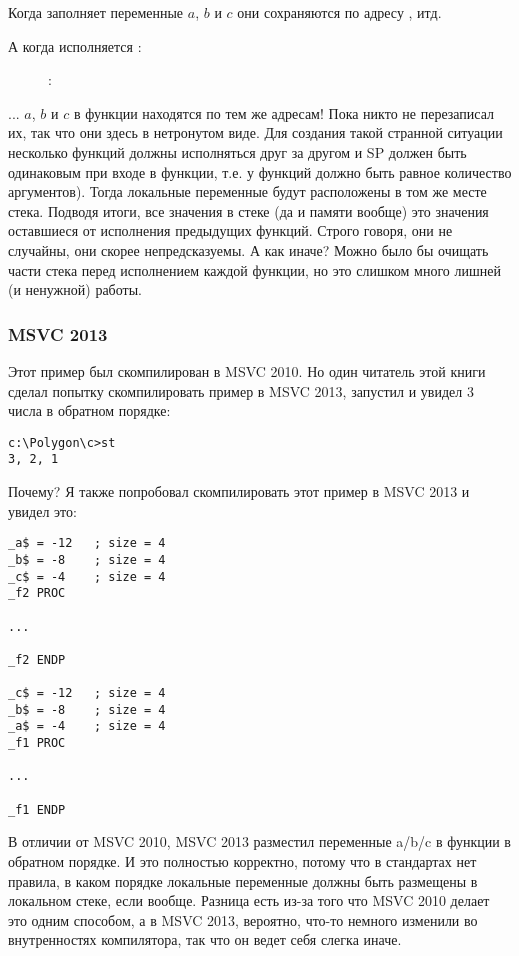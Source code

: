 Когда  заполняет переменные $a$, $b$ и $c$ они сохраняются по адресу , итд.

\clearpage
А когда исполняется :

\begin{figure}[H]
\centering
{}
\caption{\olly: }
\label{fig:stack_noise_olly2}
\end{figure}

... $a$, $b$ и $c$ в функции  находятся по тем же адресам!
Пока никто не перезаписал их, так что они здесь в нетронутом виде.
Для создания такой странной ситуации несколько функций должны исполняться друг за другом
и \ac{SP} должен быть одинаковым при входе в функции, т.е. у функций должно быть равное количество
аргументов). Тогда локальные переменные будут расположены в том же месте стека.
Подводя итоги, все значения в стеке (да и памяти вообще) это значения оставшиеся от 
исполнения предыдущих функций.
Строго говоря, они не случайны, они скорее непредсказуемы.
А как иначе?
Можно было бы очищать части стека перед исполнением каждой функции,
но это слишком много лишней (и ненужной) работы.

\subsubsection{MSVC 2013}

Этот пример был скомпилирован в MSVC 2010.
Но один читатель этой книги сделал попытку скомпилировать пример в MSVC 2013, запустил и увидел 3 числа в обратном порядке:

\begin{lstlisting}
c:\Polygon\c>st
3, 2, 1
\end{lstlisting}

Почему?
Я также попробовал скомпилировать этот пример в MSVC 2013 и увидел это:

\begin{lstlisting}[caption=MSVC 2013,style=customasmx86]
_a$ = -12	; size = 4
_b$ = -8	; size = 4
_c$ = -4	; size = 4
_f2	PROC

...

_f2	ENDP

_c$ = -12	; size = 4
_b$ = -8	; size = 4
_a$ = -4	; size = 4
_f1	PROC

...

_f1	ENDP
\end{lstlisting}

В отличии от MSVC 2010, MSVC 2013 разместил переменные a/b/c в функции  в обратном порядке.
И это полностью корректно, потому что в стандартах \CCpp нет правила, в каком порядке локальные переменные должны быть размещены в локальном стеке, если вообще.
Разница есть из-за того что MSVC 2010 делает это одним способом, а в MSVC 2013, вероятно, что-то немного изменили во внутренностях компилятора, так что он ведет себя слегка иначе.

